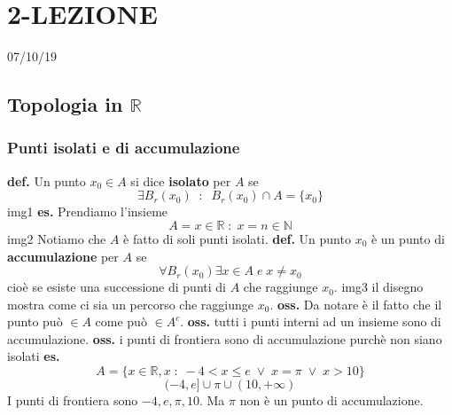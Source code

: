 \section*{2-LEZIONE}
07/10/19
\subsection*{Topologia in $\mathbb{R}$}
\subsubsection*{Punti isolati e di accumulazione}
\textbf{def.} Un punto $x_0 \in A$ si dice \textbf{isolato} per $A$ se 
\[
    \exists B_r(x_0) \;\;:\;\; B_r(x_0) \cap A = \{x_0\}
\]
img1
\newline
\newline
\textbf{es.} Prendiamo l'insieme
\[
    A = {x \in \mathbb{R} \;:\; x = n \in \mathbb{N}}
\]
img2
\newline
Notiamo che $A$ è fatto di soli punti isolati.
\newline
\newline
\textbf{def.} Un punto $x_0$ è un punto di \textbf{accumulazione} per $A$ se
\[
    \forall B_r(x_0) \exists x \in A \; e \; x \neq x_0
\]
cioè se esiste una successione di punti di $A$ che raggiunge $x_0$.
\newline
img3
\newline
il disegno mostra come ci sia un percorso che raggiunge $x_0$.
\newline
\textbf{oss.} Da notare è il fatto che il punto può $\in A$ come può $\in A^c$.
\newline
\textbf{oss.} tutti i punti interni ad un insieme sono di accumulazione.
\newline
\textbf{oss.} i punti di frontiera sono di accumulazione purchè non siano isolati
\newline
\newline
\textbf{es.} 
\[
    A = \{x \in \mathbb{R}, x \;:\; -4 < x \leq e \;\lor\; x = \pi \;\lor\; x > 10\}
\]
\[
    (-4,e] \cup {\pi} \cup (10, +\infty)
\]
I punti di frontiera sono $-4, e, \pi, 10$. Ma $\pi$ non è un punto di accumulazione.
